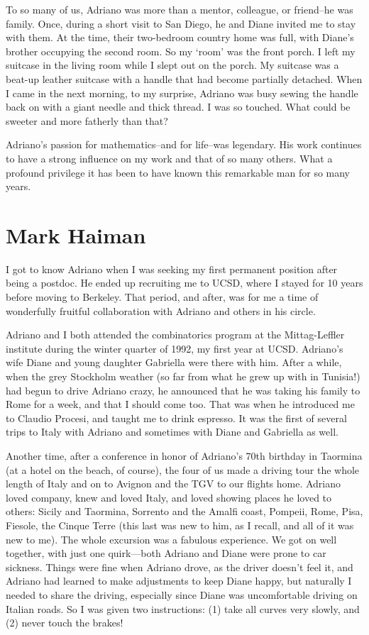 \documentclass{notices}
\begin{document}
To so many of us, Adriano was more than a mentor, colleague, or friend--he was family.  Once, during a short visit to San Diego, he and Diane invited me to stay with them. At the time, their two-bedroom country home  was full, with Diane's brother occupying the second room.  So my `room' was the front porch.   I left my suitcase in the living room while I slept out on the porch.  My suitcase was a  beat-up leather suitcase with a handle that had become partially detached.  When I came in the next morning, to my surprise, Adriano  was busy sewing the handle back on with a giant needle and thick thread. I was so touched. What could be sweeter and more fatherly than that?  

Adriano's passion for mathematics--and for life--was legendary.  His work continues to have a strong influence on my work and that of so many others.  What a profound privilege it has been to have known this remarkable man for so many years.

\section*{Mark Haiman}
I got to know Adriano when I was seeking my first permanent position after being a postdoc.  He ended up recruiting me to UCSD, where I stayed for 10 years before moving to Berkeley.  That period, and after, was for me a time of wonderfully fruitful collaboration with Adriano and others in his circle.

Adriano and I both attended the combinatorics program at the Mittag-Leffler institute during the winter quarter of 1992, my first year at UCSD.   Adriano's wife Diane and young daughter Gabriella were there with him.  After a while, when the grey Stockholm weather (so far from what he grew up with in Tunisia!) had begun to drive Adriano crazy, he announced that he was taking his family to Rome for a week, and that I should come too.  That was when he introduced me to Claudio Procesi, and taught me to drink espresso.  It was the first of several trips to Italy with Adriano and sometimes with Diane and Gabriella as well.

Another time, after a conference in honor of Adriano's 70th birthday in Taormina (at a hotel on the beach, of course), the four of us made a driving tour the whole length of Italy and on to Avignon and the TGV to our flights home.  Adriano loved company, knew and loved Italy, and loved showing places he loved to others: Sicily and Taormina, Sorrento and the Amalfi coast, Pompeii, Rome, Pisa, Fiesole, the Cinque Terre (this last was new to him, as I recall, and all of it was new to me).  The whole excursion was a fabulous experience.  We got on well together, with just one quirk---both Adriano and Diane were prone to car sickness.  Things were fine when Adriano drove, as the driver doesn't feel it, and Adriano had learned to make adjustments to keep Diane happy, but naturally I needed to share the driving, especially since Diane was uncomfortable driving on Italian roads.  So I was given two instructions: (1) take all curves very slowly, and (2) never touch the brakes!
\end{document}
